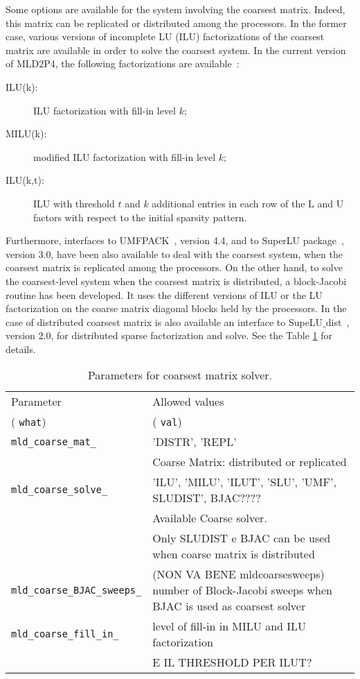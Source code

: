 Some options are available for the system involving the coarsest matrix. 
Indeed, this matrix can be replicated or distributed among the processors.
In the former case, various versions of incomplete LU (ILU) factorizations of the 
coarsest matrix are available in order to solve the coarsest system.
In the current version of MLD2P4, the following factorizations are available~\cite{saad}:
\begin{description}
\item[ILU(k):] ILU factorization with fill-in level $k$;
\item[MILU(k):] modified ILU factorization with fill-in level $k$;
\item[ILU(k,t):] ILU with threshold $t$ and $k$ additional entries in each row of the L and U factors with respect to the initial sparsity pattern.
\end{description}
Furthermore, interfaces to UMFPACK~\cite{UMFPACK}, version 4.4, and to SuperLU package~\cite{SUPERLU}, version 3.0, have been also available to deal 
with the coarsest system, when the coarsest matrix is replicated among the processors.
On the other hand, to solve the coarsest-level system when the coarsest matrix is distributed,
a block-Jacobi routine has been developed. It uses the different versions of ILU or the LU
factorization on the coarse matrix diagonal blocks held by the processors. In the case of
distributed coarsest matrix is also available an interface to SupeLU$\_$dist~\cite{SUPERLUDIST}, version 2.0, for distributed 
sparse factorization and solve.
See the Table \ref{tab:coarse_mat} for details. 
\begin{table}[h]
{\small \label{tab:coarse_mat}
\begin{tabular}{ll}
Parameter & Allowed values\\
( \verb|what|) & ( \verb|val|)\\
\verb|mld_coarse_mat_|         & 'DISTR', 'REPL' \\
                               & Coarse Matrix: distributed or replicated \\
\verb|mld_coarse_solve_|       & 'ILU', 'MILU', 'ILUT', 'SLU', 'UMF', SLUDIST', BJAC????\\
                               & Available Coarse solver.\\
                               & Only SLUDIST e BJAC can be used when coarse matrix is distributed\\
\verb|mld_coarse_BJAC_sweeps_| & (NON VA BENE mldcoarsesweeps) number of Block-Jacobi sweeps when BJAC is used as coarsest solver\\
\verb|mld_coarse_fill_in_|     & level of fill-in in MILU and ILU factorization\\
                               & E IL THRESHOLD PER ILUT? \\
\end{tabular}
\caption{Parameters for coarsest matrix solver.}
}
\end{table}


